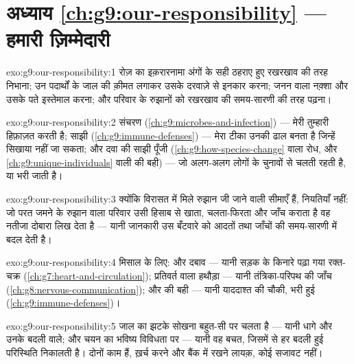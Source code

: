 \section*{अध्याय \ref{ch:g9:our-responsibility} --- हमारी ज़िम्मेदारी}

\begin{solution}{exo:g9:our-responsibility:1}
रोज़ का इक़रारनामा अंगों के सही ठहराए हुए रखरखाव की तरह निभाना; उन
पदार्थों के जाल की क़ीमत लगाकर उसके दरवाज़े से इनकार करना; जनन वाला
नक़्शा और उसके पते इस्तेमाल करना; और परिवार के रुझानों को रखरखाव की
समय-सारणी की तरह पढ़ना।
\end{solution}

\begin{solution}{exo:g9:our-responsibility:2}
संचरण (\cref{ch:g9:microbes-and-infection}) --- मेरी  तुम्हारी
हिफ़ाज़त करती है; साझी  (\cref{ch:g9:immune-defenses}) ---
मेरा टीका उनकी ढाल बनता है जिन्हें सिखाया नहीं जा सकता; और दवा की साझी
पूँजी (\cref{ch:g9:how-species-change} वाला रोध, और
\cref{ch:g9:unique-individuals} वाली  की बही) --- जो अलग-अलग लोगों
के चुनावों से चलती रहती है, या भरी जाती है।
\end{solution}

\begin{solution}{exo:g9:our-responsibility:3}
क्योंकि विरासत में मिले रुझान जी जाने वाली सीमाएँ हैं, नियतियाँ नहीं: जो
परत जमने के रुझान वाला परिवार उसी हिसाब से खाता, चलता-फिरता और जाँच कराता
है वह नतीजा दोबारा लिख देता है --- यानी जानकारी उस बँटवारे को आदतों तथा
जाँचों की समय-सारणी में बदल देती है।
\end{solution}

\begin{solution}{exo:g9:our-responsibility:4}
मिसाल के लिए:  और दबाव --- यानी सड़क के किनारे पढ़ा गया रक्त-चक्र
(\cref{ch:g7:heart-and-circulation}); प्रतिवर्त वाला हथौड़ा --- यानी
तंत्रिका-परिपथ की जाँच (\cref{ch:g8:nervous-communication}); और 
की बही --- यानी याददाश्त की चौकी, भरी हुई
(\cref{ch:g9:immune-defenses})।
\end{solution}

\begin{solution}{exo:g9:our-responsibility:5}
जाल का झटके सोखना बहुत-सी  पर चलता है --- यानी धागे और उनके
बदली वाले; और चयन का भविष्य विविधता पर --- यानी वह बचत, जिसमें से हर बदली
हुई परिस्थिति निकालती है। दोनों काम हैं, ख़र्च करने और बैंक में रखने
लायक़, कोई सजावट नहीं।
\end{solution}

